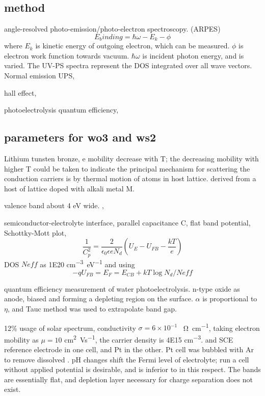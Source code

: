\subsection{method}
angle-resolved photo-emission/photo-electron spectroscopy. (ARPES)
\[
E_binding = \hbar\omega - E_k - \phi
\]
where $E_k$ is kinetic energy of outgoing electron, which can be measured. $\phi$ is electron work function towards vacuum. $\hbar\omega$ is incident photon energy, and is varied. The UV-PS spectra represent the DOS integrated over all wave vectors. Normal emission UPS, 

hall effect, 

photoelectrolysis quantum efficiency, 


\subsection{parameters for wo3 and ws2}

Lithium tunsten bronze, e mobility decrease with T; the decreasing mobility with higher T could be taken to indicate the principal mechanism for scattering the conduction carriers is by thermal motion of atoms in host lattice.   derived from a host of  lattice doped with alkali metal M. \cite{Sienko1961}

 valence band about 4 eV wide. \cite{Bringans1981}, \cite{DeAngelis1977} 

semiconductor-electrolyte interface, parallel capacitance C, flat band potential, Schottky-Mott plot,\cite{DiQuarto1981} 
\[
\frac{1}{C_p^2} = \frac{2}{\epsilon_0\epsilon e N_d} (U_E - U_{FB} - \frac{kT}{e})
\]
DOS $Neff$ as 1E20 \si{cm^{-3}eV^{-1}} and using 
\[
-qU_{FB} = E_F = E_{CB} + kT\log N_d/Neff
\]


quantum efficiency measurement of water photoelectrolysis. n-type oxide as anode, biased and forming a depleting region on the surface. $\alpha$ is proportional to $\eta$, and Tauc method was used to extrapolate band gap. \cite{Koffyberg1979}

12\% usage of solar spectrum, conductivity $\sigma = 6\times10^{-1}$ \si{\per\ohm\per\cm}, taking electron mobility as $\mu=10$ \si{cm^2\per Vs},\cite{Berak1970} the carrier density is 4E15 \si{cm^{-3}}.\cite{Butler1976}  and SCE reference electrode in one cell, and Pt in the other. Pt cell was bubbled with Ar to remove dissolved . pH changes shift the Fermi level of electrolyte; run a cell without applied potential is desirable, and  is inferior to  in this respect. The bands are essentially flat, and depletion layer necessary for charge separation does not exist. 

